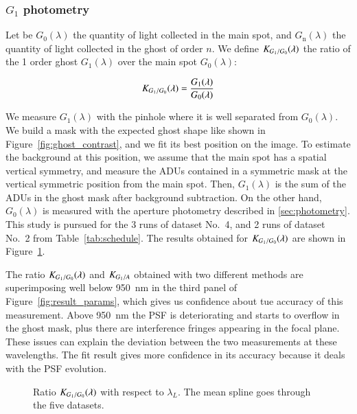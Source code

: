 \subsubsection{$G_1$ photometry}
\label{sec:ghost}

Let be $G_0(\lambda)$ the quantity of light collected in the main spot, and $G_\mathrm{n}(\lambda)$ the quantity of light collected in the ghost of order $n$. We define $K_{G_1/G_0}(\lambda)$ the ratio of the 1 order ghost $G_1(\lambda)$ over the main spot $G_0(\lambda)$:

\begin{equation}
    K_{G_1/G_0}(\lambda) = \frac{G_1(\lambda)}{G_0(\lambda)}
    \label{eq:ratio_ghost}
\end{equation}

We measure $G_1(\lambda)$ with the \spinhole pinhole where it is well separated from $G_0(\lambda)$. We build a mask with the expected ghost shape like shown in Figure~\ref{fig:ghost_contrast}, and we fit its best position on the image. To estimate the background at this position, we assume that the main spot has a spatial vertical symmetry, and measure the ADUs contained in a symmetric mask at the vertical symmetric position from the main spot. Then, $G_1(\lambda)$ is the sum of the ADUs in the ghost mask after background subtraction. On the other hand, $G_0(\lambda)$ is measured with the aperture photometry described in \ref{sec:photometry}. This study is pursued for the 3 runs of dataset No.~4, and 2 runs of dataset No.~2 from Table~\ref{tab:schedule}. The results obtained for $K_{G_1/G_0}(\lambda)$ are shown in Figure~\ref{fig:ghost_ratio}. 

The ratio $K_{G_1/G_0}(\lambda)$ and $K_{G_1/A}$ obtained with two different methods are superimposing well below \SI{950}{\nano\meter} in the third panel of Figure~\ref{fig:result_params}, which gives us confidence about tue accuracy of this measurement. Above \SI{950}{\nano\meter} the PSF is deteriorating and starts to overflow in the ghost mask, plus there are interference fringes appearing in the focal plane. These issues can explain the deviation between the two measurements at these wavelengths. The fit result gives more confidence in its accuracy because it deals with the PSF evolution.

\begin{figure}[h]
     \centering
     \caption{Ratio $K_{G_1/G_0}(\lambda)$ with respect to $\lambda_L$. The mean spline goes through the five datasets.}
     \label{fig:ghost_ratio}
\end{figure}

